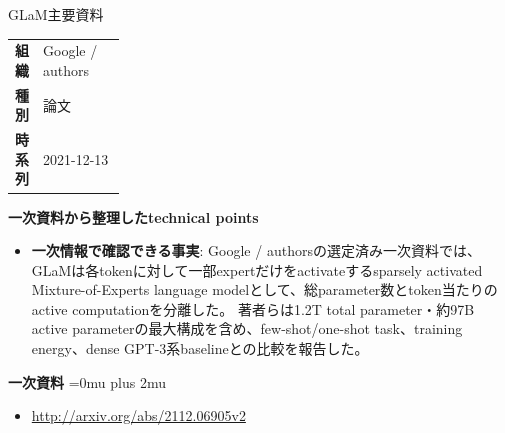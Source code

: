 \begin{technicalnote}{GLaM}{主要資料}
\begingroup
\begin{tabularx}{\linewidth}{@{}>{\bfseries}p{0.22\linewidth}X@{}}
組織 & Google / authors \\
種別 & 論文 \\
時系列 & 2021-12-13 \\
\end{tabularx}
\smallskip
\begin{minipage}{\linewidth}
{\bfseries 一次資料から整理したtechnical points}
\begin{itemize}[leftmargin=1.5em,itemsep=0.35em]
\item \textbf{一次情報で確認できる事実}: Google / authorsの選定済み一次資料では、GLaMは各tokenに対して一部expertだけをactivateするsparsely activated Mixture-of-Experts language modelとして、総parameter数とtoken当たりのactive computationを分離した。 著者らは1.2T total parameter・約97B active parameterの最大構成を含め、few-shot/one-shot task、training energy、dense GPT-3系baselineとの比較を報告した。
\end{itemize}
\begin{minipage}{\linewidth}
\begin{samepage}
{\bfseries 一次資料}
\begingroup\sloppy
\Urlmuskip=0mu plus 2mu\relax
\begin{itemize}[leftmargin=1.5em,itemsep=0.25em]
\item {\scriptsize\url{http://arxiv.org/abs/2112.06905v2}}
\end{itemize}
\endgroup
\end{samepage}
\end{minipage}
\end{minipage}
\endgroup
\end{technicalnote}
\medskip

